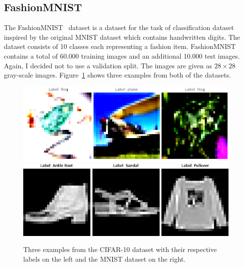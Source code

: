 \subsection{FashionMNIST}
The FashionMNIST~\cite{DBLP:journals/corr/abs-1708-07747} dataset is a dataset for the task of classification dataset inspired by the original MNIST dataset which contains handwritten digits.
The dataset consists of 10 classes each representing a fashion item.
FashionMNIST contains a total of 60.000 training images and an additional 10.000 test images.
Again, I decided not to use a validation split.
The images are given as $28\times 28$ gray-scale images.
Figure~\ref{fig:datasets_ex} shows three examples from both of the datasets.
\begin{figure}[t]
    \centering
    \includegraphics[width=.45\textwidth]{res/CIFAR.png}
    \includegraphics[width=.45\textwidth]{res/MNIST.png}
    \caption{Three examples from the CIFAR-10 dataset with their respective labels on the left and the MNIST dataset on the right.}
    \label{fig:datasets_ex}
\end{figure}

